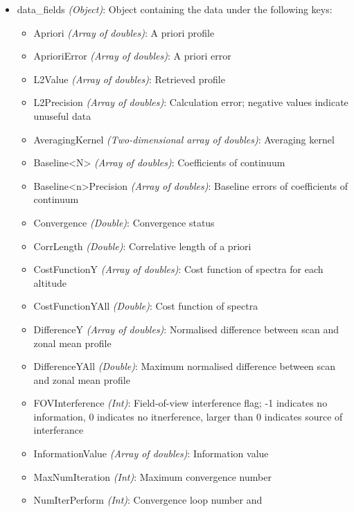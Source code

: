 \begin{itemize}
    \item data\_fields \emph{(Object)}: Object containing the data under the
        following keys:
        \begin{itemize}
            \item Apriori \emph{(Array of doubles)}: A priori profile
            \item AprioriError \emph{(Array of doubles)}: A priori error
            \item L2Value \emph{(Array of doubles)}: Retrieved profile
            \item L2Precision \emph{(Array of doubles)}: Calculation error;
                negative values indicate unuseful data
            \item AveragingKernel \emph{(Two-dimensional array of doubles)}:
                Averaging kernel
            \item Baseline<N> \emph{(Array of doubles)}: Coefficients of
                continuum
            \item Baseline<n>Precision \emph{(Array of doubles)}: Baseline
                errors of coefficients of continuum
            \item Convergence \emph{(Double)}: Convergence status
            \item CorrLength \emph{(Double)}: Correlative length of a priori
            \item CostFunctionY \emph{(Array of doubles)}: Cost function of
                spectra for each altitude
            \item CostFunctionYAll \emph{(Double)}: Cost function of spectra
            \item DifferenceY \emph{(Array of doubles)}: Normalised 
                difference between scan and zonal mean profile
            \item DifferenceYAll \emph{(Double)}: Maximum normalised 
                difference between scan and zonal mean profile
            \item FOVInterference \emph{(Int)}: Field-of-view interference
                flag; -1 indicates no information, 0 indicates no itnerference,
                larger than 0 indicates source of interferance
            \item InformationValue \emph{(Array of doubles)}: Information value
            \item MaxNumIteration \emph{(Int)}: Maximum convergence number
            \item NumIterPerform \emph{(Int)}: Convergence loop number and

\end{itemize}
\end{itemize}
